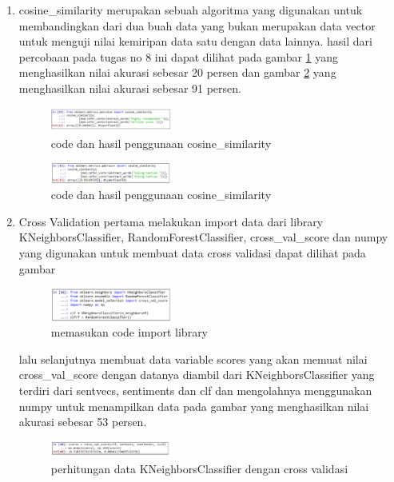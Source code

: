 \begin{enumerate}
        \item cosine\_similarity
        \subitem merupakan sebuah algoritma yang digunakan untuk membandingkan dari dua buah data yang bukan merupakan data vector untuk menguji nilai kemiripan data satu dengan data lainnya. hasil dari percobaan pada tugas no 8 ini dapat dilihat pada gambar \ref{l10} yang menghasilkan nilai akurasi sebesar 20 persen dan gambar \ref{l11} yang menghasilkan nilai akurasi sebesar 91 persen.
        \begin{figure}[H]
            \includegraphics[width=4cm]{figures/1174039/chapter5/29.png}
            \centering
            \caption{code dan hasil penggunaan cosine\_similarity}
            \label{l10}
        \end{figure}
        
        \begin{figure}[H]
            \includegraphics[width=4cm]{figures/1174039/chapter5/30.png}
            \centering
            \caption{code dan hasil penggunaan cosine\_similarity}
            \label{l11}
        \end{figure}
        
        \item Cross Validation
        \subitem pertama melakukan import data dari library KNeighborsClassifier, RandomForestClassifier, cross\_val\_score dan numpy yang digunakan untuk membuat data cross validasi dapat dilihat pada gambar
        \begin{figure}[H]
            \includegraphics[width=4cm]{figures/1174039/chapter5/31.png}
            \centering
            \caption{memasukan code import library}
        \end{figure}
        
        \subitem lalu selanjutnya membuat data variable scores yang akan memuat nilai cross\_val\_score dengan datanya diambil dari KNeighborsClassifier yang terdiri dari sentvecs, sentiments dan clf dan mengolahnya menggunakan numpy untuk menampilkan data pada gambar yang menghasilkan nilai akurasi sebesar 53 persen.
        \begin{figure}[H]
            \includegraphics[width=4cm]{figures/1174039/chapter5/32.png}
            \centering
            \caption{perhitungan data KNeighborsClassifier dengan cross validasi}
        \end{figure}
        

\end{enumerate}
